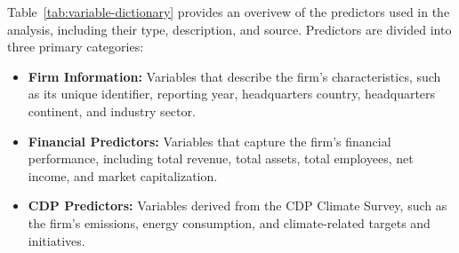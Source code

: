 \noindent Table~\ref{tab:variable-dictionary} provides an overivew of the predictors used in the analysis, including their type, description, and source. Predictors are divided into three primary categories: \begin{itemize}
    \item \textbf{Firm Information:} Variables that describe the firm's characteristics, such as its unique identifier, reporting year, headquarters country, headquarters continent, and industry sector.
    \item \textbf{Financial Predictors:} Variables that capture the firm's financial performance, including total revenue, total assets, total employees, net income, and market capitalization.
    \item \textbf{CDP Predictors:} Variables derived from the CDP Climate Survey, such as the firm's emissions, energy consumption, and climate-related targets and initiatives.
\end{itemize}


